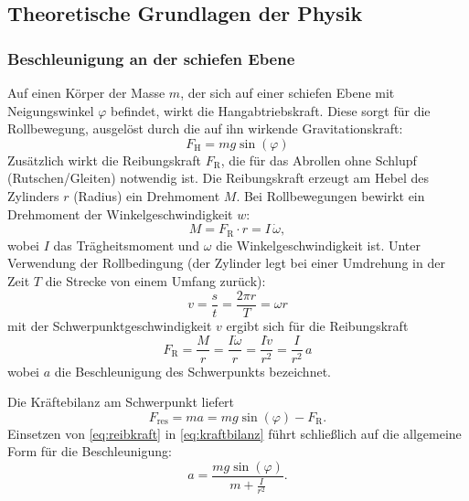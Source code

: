 
\subsection[Theoretische Grundlagen der Physik]{Theoretische Grundlagen der Physik \autocite{Skript_1}}
\subsubsection{Beschleunigung an der schiefen Ebene}
Auf einen Körper der Masse \(m\), der sich auf einer schiefen Ebene mit Neigungswinkel \(\varphi\) befindet, wirkt die Hangabtriebskraft. Diese sorgt für die Rollbewegung, ausgelöst durch die auf ihn wirkende Gravitationskraft:
\begin{equation}
    F_\text{H} = m g \sin(\varphi)
    \label{eq:hangabtrieb}
\end{equation}
Zusätzlich wirkt die Reibungskraft \(F_\text{R}\), die für das Abrollen ohne Schlupf (Rutschen/Gleiten) notwendig ist.  
Die Reibungskraft erzeugt am Hebel des Zylinders \(r\) (Radius) ein Drehmoment \(M\). Bei Rollbewegungen bewirkt ein Drehmoment der Winkelgeschwindigkeit \(w\):
\begin{equation}
    M = F_\text{R} \cdot r = I \, \dot{\omega},
    \label{eq:drehmoment}
\end{equation}
wobei \(I\) das Trägheitsmoment und \(\omega\) die Winkelgeschwindigkeit ist.  
Unter Verwendung der Rollbedingung (der Zylinder legt bei einer Umdrehung in der Zeit \(T\) die Strecke von einem Umfang zurück):
\begin{equation}
    v = \frac{s}{t}=\frac{2\pi r}{T}=\omega r
    \label{eq:rollbedingung}
\end{equation}
mit der Schwerpunktgeschwindigkeit \(v\) ergibt sich für die Reibungskraft
\begin{equation}
    F_\text{R} = \frac{M}{r}=\frac{I\dot{\omega}}{r}=\frac{I\dot{v}}{r^2}=\frac{I}{r^2} \, a
    \label{eq:reibkraft}
\end{equation}
wobei \(a\) die Beschleunigung des Schwerpunkts bezeichnet.  

Die Kräftebilanz am Schwerpunkt liefert
\begin{equation}
    F_{\text{res}}=m a = m g \sin(\varphi) - F_\text{R}.
    \label{eq:kraftbilanz}
\end{equation}
\newpage
Einsetzen von \cref{eq:reibkraft} in 
 \cref{eq:kraftbilanz} führt schließlich auf die allgemeine Form für die Beschleunigung:
\begin{equation}
    a = \frac{m g \sin(\varphi)}{m + \frac{I}{r^2}}.
    \label{eq:beschleunigung}
\end{equation}


